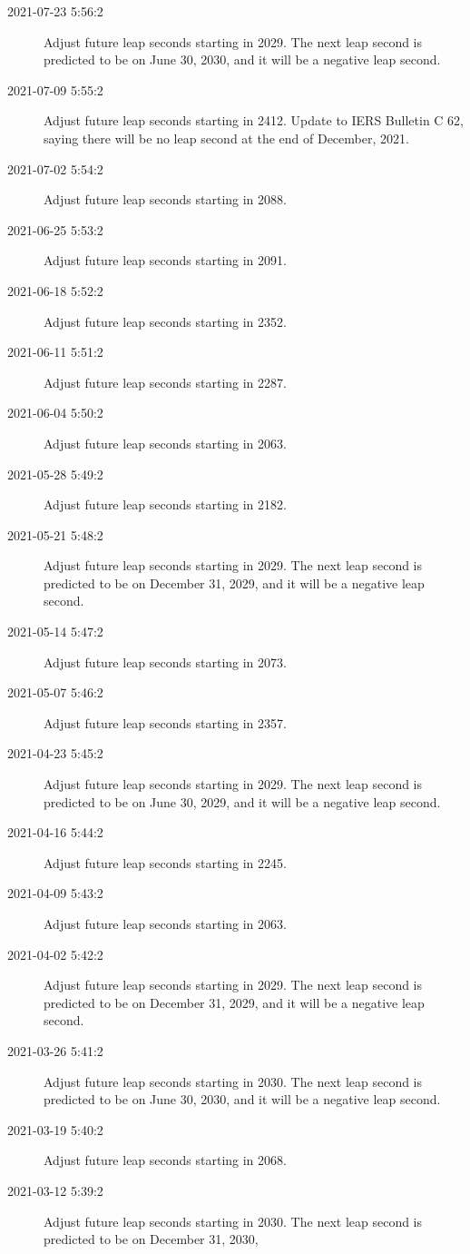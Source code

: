 \documentclass[letterpaper,twoside]{article}
\begin{document}
\begin{description}
\item[2021-07-23 5:56:2]Adjust future leap seconds starting in 2029.
  The next leap second is predicted to be on June 30, 2030, and it
  will be a negative leap second.
\item[2021-07-09 5:55:2]Adjust future leap seconds starting in 2412.
  Update to IERS Bulletin C 62, saying there will be no leap second
  at the end of December, 2021.
\item[2021-07-02 5:54:2]Adjust future leap seconds starting in 2088.
\item[2021-06-25 5:53:2]Adjust future leap seconds starting in 2091.
\item[2021-06-18 5:52:2]Adjust future leap seconds starting in 2352.
\item[2021-06-11 5:51:2]Adjust future leap seconds starting in 2287.
\item[2021-06-04 5:50:2]Adjust future leap seconds starting in 2063.
\item[2021-05-28 5:49:2]Adjust future leap seconds starting in 2182.
\item[2021-05-21 5:48:2]Adjust future leap seconds starting in 2029.
  The next leap second is predicted to be on December 31, 2029, and
  it will be a negative leap second.
\item[2021-05-14 5:47:2]Adjust future leap seconds starting in 2073.
\item[2021-05-07 5:46:2]Adjust future leap seconds starting in 2357.
\item[2021-04-23 5:45:2]Adjust future leap seconds starting in 2029.
  The next leap second is predicted to be on June 30, 2029, and
  it will be a negative leap second.
\item[2021-04-16 5:44:2]Adjust future leap seconds starting in 2245.
\item[2021-04-09 5:43:2]Adjust future leap seconds starting in 2063.
\item[2021-04-02 5:42:2]Adjust future leap seconds starting in 2029.
  The next leap second is predicted to be on December 31, 2029, and
  it will be a negative leap second.
\item[2021-03-26 5:41:2]Adjust future leap seconds starting in 2030.
  The next leap second is predicted to be on June 30, 2030, and
  it will be a negative leap second.
\item[2021-03-19 5:40:2]Adjust future leap seconds starting in 2068.
\item[2021-03-12 5:39:2]Adjust future leap seconds starting in 2030.
  The next leap second is predicted to be on December 31, 2030,

\end{description}
\end{document}
